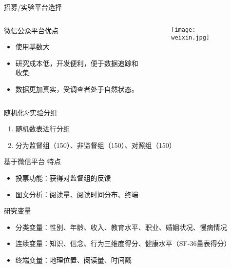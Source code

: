 \begin{frame}{招募/实验平台选择}
\begin{columns}
    \begin{column}{0.5\textwidth}
\begin{block}{微信公众平台优点}
\begin{itemize}
    \item 使用基数大
    \item 研究成本低，开发便利，便于数据追踪和收集
    \item 数据更加真实，受调查者处于自然状态。
\end{itemize}
\end{block}
    \end{column}
\begin{column}{0.5\textwidth}
\begin{figure}[h]
    \texttt{[image: weixin.jpg]}
\end{figure}
\end{column}
\end{columns}
\end{frame}

\begin{frame}{随机化\&实验分组}
\begin{enumerate}
    \item 随机数表进行分组
    \item 分为监督组（150）、非监督组（150）、对照组（150）
\end{enumerate}

\begin{block}{基于微信平台 特点}
    \begin{itemize}
        \item 投票功能：获得对监督组的反馈
        \item 图文分析：阅读量、阅读时间分布、终端
        
    \end{itemize}
\end{block}
\end{frame}



\begin{frame}{研究变量}
    \begin{itemize}
        \item 分类变量：性别、年龄、收入、教育水平、职业、婚姻状况、慢病情况
        \item 连续变量：知识、信念、行为三维度得分、健康水平（SF-36量表得分）
        \item 终端变量：地理位置、阅读量、时间戳
    \end{itemize}
\end{frame}



